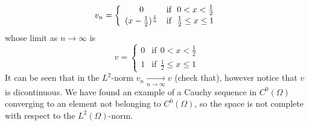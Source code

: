 
\begin{equation}
v_n = \left \{
\begin{array}{cl}
0 & \mbox{if}~~0<x<\frac12  \\
(x-\frac12)^{\frac{1}{n}} & \mbox{if}~~\frac12 \le x \le 1
\end{array}
\right. \labeq{exacauchy}
\end{equation}
whose limit as $n\rightarrow \infty$ is
\begin{equation}
v = \left \{
\begin{array}{cc}
0 & \mbox{if}~~0<x<\frac12  \\
1 & \mbox{if}~~\frac12 \le x \le 1
\end{array}
\right.
\end{equation}
It can be seen that in the $L^2$-norm $v_n \xrightarrow[n\rightarrow \infty]{} v$
(check that), however notice that $v$ is dicontinuous.
We have found an example of a Cauchy sequence in $C^0(\Omega)$ converging to an element not belonging
to $C^0(\Omega)$, so the space is not complete with respect to the $L^2(\Omega)$-norm.

\bigskip

